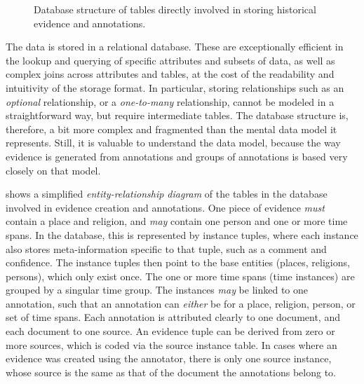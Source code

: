 \begin{figure}[htb]
  \caption{Database structure of tables directly involved in storing historical evidence and annotations.}
  \label{fig:annotator-schema}
\end{figure}

The data is stored in a relational database.
These are exceptionally efficient in the lookup and querying of specific attributes and subsets of data, as well as complex joins across attributes and tables, at the cost of the readability and intuitivity of the storage format.
In particular, storing relationships such as an \emph{optional} relationship, or a \emph{one-to-many} relationship, cannot be modeled in a straightforward way, but require intermediate tables.
The database structure is, therefore, a bit more complex and fragmented than the mental data model it represents.
Still, it is valuable to understand the data model, because the way evidence is generated from annotations and groups of annotations is based very closely on that model.

 shows a simplified \emph{entity-relationship diagram} of the tables in the database involved in evidence creation and annotations.
One piece of evidence \emph{must} contain a place and religion, and \emph{may} contain one person and one or more time spans.
In the database, this is represented by instance tuples, where each instance also stores meta-information specific to that tuple, such as a comment and confidence.
The instance tuples then point to the base entities (places, religions, persons), which only exist once.
The one or more time spans (time instances) are grouped by a singular time group.
The instances \emph{may} be linked to one annotation, such that an annotation can \emph{either} be for a place, religion, person, or set of time spans.
Each annotation is attributed clearly to one document, and each document to one source.
An evidence tuple can be derived from zero or more sources, which is coded via the source instance table.
In cases where an evidence was created using the annotator, there is only one source instance, whose source is the same as that of the document the annotations belong to.

